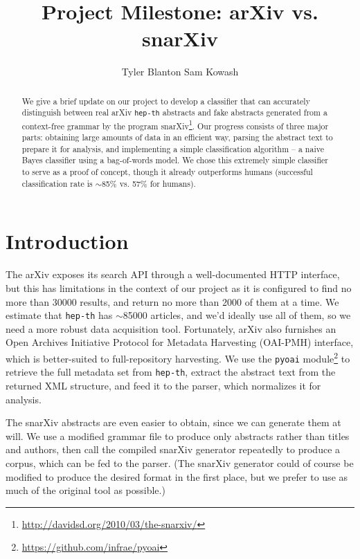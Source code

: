 \documentclass{article}
\title{Project Milestone: arXiv vs. snarXiv}
\author{Tyler Blanton \And Sam Kowash}
\begin{document}

\maketitle

\begin{abstract}
  We give a brief update on our project to develop a classifier that can accurately distinguish between real arXiv \texttt{hep-th} abstracts and fake abstracts generated from a context-free grammar by the program snarXiv\footnote{\url{http://davidsd.org/2010/03/the-snarxiv/}}.
  Our progress consists of three major parts: obtaining large amounts of data in an efficient way, parsing the abstract text to prepare it for analysis, and implementing a simple classification algorithm -- a naive Bayes classifier using a bag-of-words model.
  We chose this extremely simple classifier to serve as a proof of concept, though it already outperforms humans (successful classification rate is $\sim$85\% vs. 57\% for humans).
\end{abstract}




\section{Introduction} \label{sec:intro}
The arXiv exposes its search API through a well-documented HTTP interface, but this has limitations in the context of our project as it is configured to find no more than 30000 results, and return no more than 2000 of them at a time.
We estimate that \texttt{hep-th} has $\sim$85000 articles, and we'd ideally use all of them, so we need a more robust data acquisition tool.
Fortunately, arXiv also furnishes an Open Archives Initiative Protocol for Metadata Harvesting (OAI-PMH) interface, which is better-suited to full-repository harvesting. We use the \texttt{pyoai} module\footnote{\url{https://github.com/infrae/pyoai}} to retrieve the full metadata set from \texttt{hep-th}, extract the abstract text from the returned XML structure, and feed it to the parser, which normalizes it for analysis.

The snarXiv abstracts are even easier to obtain, since we can generate them at will.
We use a modified grammar file to produce only abstracts rather than titles and authors, then call the compiled snarXiv generator repeatedly to produce a corpus, which can be fed to the parser.
(The snarXiv generator could of course be modified to produce the desired format in the first place, but we prefer to use as much of the original tool as possible.)
\end{document}

